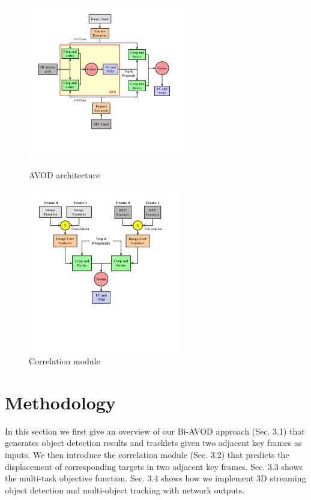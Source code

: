 \documentclass{bmvc2k}
\begin{document}
\begin{figure}
	\setlength{\abovecaptionskip}{-0.5cm}
	\begin{minipage}[t]{0.5\linewidth}
		\centering
		\includegraphics[trim={0cm, 4cm, 2cm, 0cm}, clip, width=2.7in]{images/AVOD.pdf}
		\caption{AVOD architecture}
		\label{fig:avod}
	\end{minipage}%
	\begin{minipage}[t]{0.5\linewidth}
		\centering
		\includegraphics[trim={0cm, 6cm, 2cm, 0cm}, clip, width=2.6in]{images/Correlation.pdf}
		\caption{Correlation module}
		\label{fig:correlation}
	\end{minipage}
\end{figure}

\section{Methodology}
\label{sec:method}
In this section we first give an overview of our Bi-AVOD approach (Sec. 3.1) that generates object detection results and tracklets given two adjacent key frames as inputs. We then introduce the correlation module (Sec. 3.2) that predicts the displacement of corresponding targets in two adjacent key frames. Sec. 3.3 shows the multi-task objective function. Sec. 3.4 shows how we implement 3D streaming object detection and multi-object tracking with network outputs.
\end{document}
